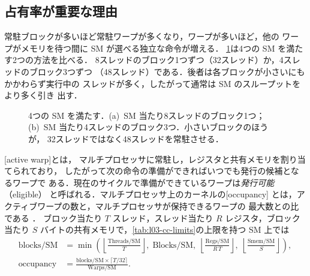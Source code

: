 \documentclass[../main.tex]{subfiles}
\begin{document}
\subsection{占有率が重要な理由}

常駐ブロックが多いほど常駐ワープが多くなり，ワープが多いほど，他の
ワープがメモリを待つ間に SM が選べる独立な命令が増える．
\cref{fig:l03-occupancy-cases}は4つの SM を満たす2つの方法を比べる．
8スレッドのブロック1つずつ（32スレッド）か，4スレッドのブロック3つずつ
（48スレッド）である．後者は各ブロックが小さいにもかかわらず実行中の
スレッドが多く，したがって通常は SM のスループットをより多く引き
出す．

\begin{figure}[tb]
  \centering
  
  \caption{4つの SM を満たす．(a)~SM 当たり8スレッドのブロック1つ；
    (b)~SM 当たり4スレッドのブロック3つ．小さいブロックのほうが，
    32スレッドではなく48スレッドを常駐させる．}
  \label{fig:l03-occupancy-cases}
\end{figure}

\begin{definition}
  [active warp]とは，
  マルチプロセッサに常駐し，レジスタと共有メモリを割り当てられており，
  したがって次の命令の準備ができればいつでも発行の候補となるワープで
  ある．現在のサイクルで準備ができているワープは\emph{発行可能}（eligible）
  と呼ばれる．マルチプロセッサ上のカーネルの[occupancy]
  とは，アクティブワープの数と，マルチプロセッサが保持できるワープの
  最大数との比である \cite[§11.1]{nvidia2026cudabestpractices}．
  ブロック当たり $T$ スレッド，スレッド当たり $R$ レジスタ，ブロック
  当たり $S$ バイトの共有メモリで，\cref{tab:l03-cc-limits}の上限を持つ
  SM 上では
  \begin{align}
    \text{blocks/SM} &= \min\!\left(
      \left\lfloor \frac{\text{Threads/SM}}{T} \right\rfloor,\;
      \text{Blocks/SM},\;
      \left\lfloor \frac{\text{Regs/SM}}{R\,T} \right\rfloor,\;
      \left\lfloor \frac{\text{Smem/SM}}{S} \right\rfloor \right),
    \label{eq:l03-blocks}\\
    \text{occupancy} &= \frac{\text{blocks/SM} \times \lceil T/32 \rceil}
                             {\text{Warps/SM}}.
    \label{eq:l03-occupancy}
  \end{align}
\end{definition}
\end{document}
